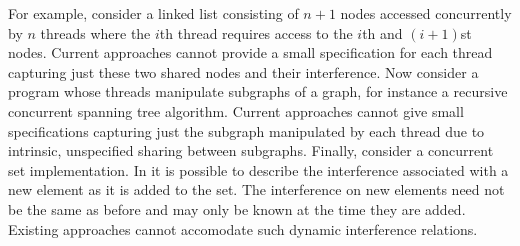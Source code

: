 For example, consider a linked list consisting of $n+1$ nodes accessed
concurrently by $n$ threads where the $i$th
thread requires access to the $i$th and $(i+1)$st nodes. Current
approaches cannot provide a small specification for each thread capturing just these two shared nodes and their interference. Now consider a program whose threads manipulate subgraphs of a graph, for instance  a recursive
concurrent spanning tree algorithm. Current approaches cannot give small specifications capturing just the subgraph manipulated by each thread due to intrinsic, unspecified sharing  between subgraphs.
Finally, consider a concurrent set implementation. In \colosl it is
possible to describe the interference associated with a new element as it is added to the set. The interference on new elements need not be the same as before and may only be known at the time they are added. Existing approaches cannot accomodate such dynamic interference relations.




